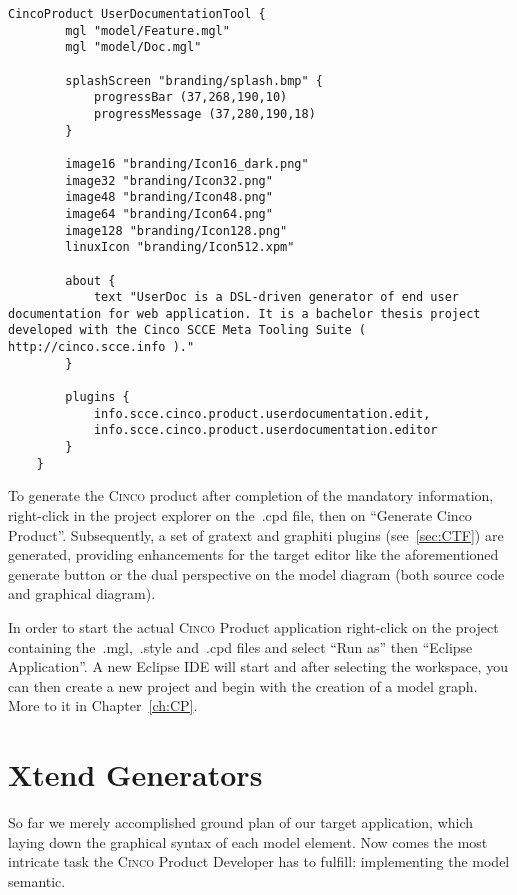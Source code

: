 \begin{lstlisting}[language=MGL, caption={UserDocumentationTool.cpd}]
    CincoProduct UserDocumentationTool {
        mgl "model/Feature.mgl"
        mgl "model/Doc.mgl"
        
        splashScreen "branding/splash.bmp" {
            progressBar (37,268,190,10)
            progressMessage (37,280,190,18)
        }
    
        image16 "branding/Icon16_dark.png"
        image32 "branding/Icon32.png"
        image48 "branding/Icon48.png"
        image64 "branding/Icon64.png"
        image128 "branding/Icon128.png"
        linuxIcon "branding/Icon512.xpm"
	
        about {
            text "UserDoc is a DSL-driven generator of end user documentation for web application. It is a bachelor thesis project developed with the Cinco SCCE Meta Tooling Suite ( http://cinco.scce.info )."
        }

        plugins {
            info.scce.cinco.product.userdocumentation.edit,
            info.scce.cinco.product.userdocumentation.editor
        }
    }
\end{lstlisting}

To generate the \textsc{Cinco} product after completion of the mandatory information, right-click in the project explorer on the~.cpd file, then on ``Generate Cinco Product''. Subsequently, a set of gratext and graphiti plugins (see~\ref{sec:CTF}) are generated, providing enhancements for the target editor like the aforementioned generate button or the dual perspective on the model diagram (both source code and graphical diagram). 

In order to start the actual \textsc{Cinco} Product application right-click on the project containing the~.mgl,~.style and~.cpd files and select ``Run as'' then ``Eclipse Application''. A new Eclipse IDE will start and after selecting the workspace, you can then create a new project and begin with the creation of a model graph. More to it in Chapter~\ref{ch:CP}.

\section{Xtend Generators}\label{sec:GEN}

So far we merely accomplished ground plan of our target application, which laying down the graphical syntax of each model element. Now comes the most intricate task the \textsc{Cinco} Product Developer has to fulfill: implementing the model semantic. 

